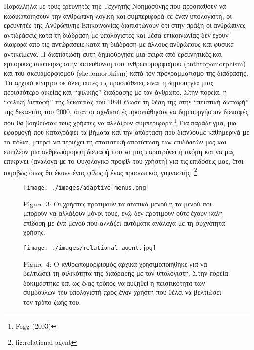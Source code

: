 \documentclass[
]{article}
\begin{document}
Παράλληλα με τους ερευνητές της Τεχνητής Νοημοσύνης που προσπαθούν να
κωδικοποιήσουν την ανθρώπινη λογική και συμπεριφορά σε έναν υπολογιστή,
οι ερευνητές της Ανθρώπινης Επικοινωνίας διαπιστώνουν ότι στην πράξη οι
ανθρώπινες αντιδράσεις κατά τη διάδραση με υπολογιστές και μέσα
επικοινωνίας δεν έχουν διαφορά από τις αντιδράσεις κατά τη διάδραση με
άλλους ανθρώπους και φυσικά αντικείμενα. Η διαπίστωση αυτή δημιούργησε
μια σειρά από ερευνητικές και εμπορικές απόπειρες στην κατεύθυνση του
ανθρωπομορφισμού (anthropomorphism) και του σκευομορφισμού
(skeuomorphism) κατά τον προγραμματισμό της διάδρασης. Το αρχικό κίνητρο
σε όλες αυτές τις προσπάθειες είναι η δημιουργία μιας περισσότερο
οικείας και ``φιλικής'' διάδρασης με τον άνθρωπο. Στην πορεία, η
``φιλική διεπαφή'' της δεκαετίας του 1990 έδωσε τη θέση της στην
``πειστική διεπαφή'' της δεκαετίας του 2000, όταν οι σχεδιαστές
προσπάθησαν να δημιουργήσουν διεπαφές που θα βοηθούσαν τους χρήστες να
αλλάξουν συμπεριφορά.\footnote{Fogg (2003)} Για παράδειγμα, μια εφαρμογή
που καταγράφει τα βήματα και την απόσταση που διανύουμε καθημερινά με τα
πόδια, μπορεί να περιέχει τη στατιστική αποτύπωση των επιδόσεών μας και
επιπλέον μια ανθρωπόμορφη διεπαφή που να μας παροτρύνει ή ακόμη και να
μας επικρίνει (ανάλογα με το ψυχολογικό προφίλ του χρήστη) για τις
επιδόσεις μας, έτσι ακριβώς όπως θα έκανε ένας φίλος ή ένας προσωπικός
γυμναστής. \footnote{fig:relational-agent}

\leavevmode{}%
\begin{figure}
\hypertarget{fig:adaptive-menus}{%
\centering
\texttt{[image: ./images/adaptive-menus.png]}
\caption{Figure~3: Οι χρήστες προτιμούν τα στατικά μενού ή τα μενού που
μπορούν να αλλάξουν μόνοι τους, ενώ δεν προτιμούν ούτε έχουν καλή
επίδοση με ένα μενού που αλλάζει αυτόματα ανάλογα με τη συχνότητα
χρήσης.}\label{fig:adaptive-menus}
}
\end{figure}

\leavevmode{}%
\begin{figure}
\hypertarget{fig:relational-agent}{%
\centering
\texttt{[image: ./images/relational-agent.jpg]}
\caption{Figure~4: Ο ανθρωπομορφισμός αρχικά χρησιμοποιήθηκε για να
βελτιώσει τη φιλικότητα της διάδρασης με τον υπολογιστή. Στην πορεία
δοκιμάστηκε και ως ένας τρόπος να αυξηθεί η πειστικότητα των συμβουλών
του υπολογιστή προς έναν χρήστη που θέλει να βελτιώσει τον τρόπο ζωής
του.}\label{fig:relational-agent}
}
\end{figure}
\end{document}
